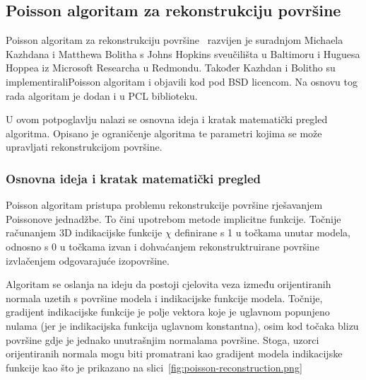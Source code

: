 

\newpage
\subsection{Poisson algoritam za rekonstrukciju površine} %
\label{sub:Poisson}
Poisson algoritam za rekonstrukciju površine~\cite{Kazhdan:2006}
razvijen je suradnjom Michaela Kazhdana i Matthewa Bolitha s Johns
Hopkins sveučilišta u Baltimoru i Huguesa Hoppea iz Microsoft Researcha
u Redmondu. Također Kazhdan i Bolitho su implementirali\footnotemark[1]
Poisson algoritam i objavili kod pod BSD licencom. Na osnovu tog rada
algoritam je dodan i u PCL biblioteku.

U ovom potpoglavlju nalazi se osnovna ideja i kratak matematički pregled
algoritma. Opisano je ograničenje algoritma te parametri kojima se može
upravljati rekonstrukcijom površine.



\subsubsection{Osnovna ideja i kratak matematički pregled} %
\label{ssub:Osnovna ideja i kratak matematički pregled}

Poisson algoritam pristupa problemu rekonstrukcije površine rješavanjem
Poissonove jednadžbe. To čini upotrebom metode implicitne funkcije.
Točnije računanjem 3D indikacijske funkcije \(\chi\) definirane s 1 u
točkama unutar modela, odnosno s 0 u točkama izvan i dohvaćanjem
rekonstruktruirane površine izvlačenjem odgovarajuće izopovršine.

Algoritam se oslanja na ideju da postoji cjelovita veza između
orijentiranih normala uzetih s površine modela i indikacijske funkcije
modela. Točnije, gradijent indikacijske funkcije je polje vektora koje
je uglavnom popunjeno nulama (jer je indikacijska funkcija uglavnom
konstantna), osim kod točaka blizu površine gdje je jednako unutrašnjim
normalama površine. Stoga, uzorci orijentiranih normala mogu biti
promatrani kao gradijent modela indikacijske funkcije kao što je
prikazano na slici~\ref{fig:poisson-reconstruction.png}

